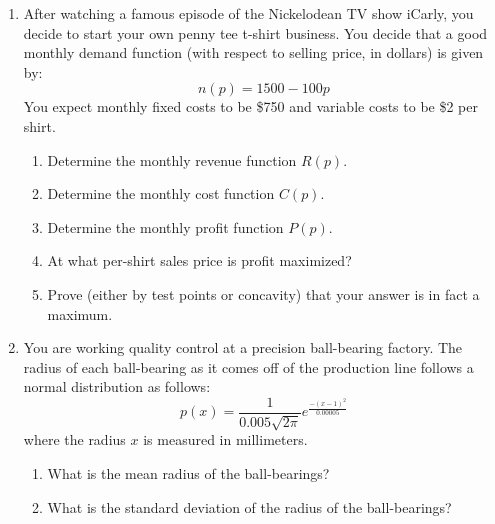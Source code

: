 \documentclass[letterpaper,12pt,fleqn]{article}
\begin{document}
\begin{enumerate}[left=0pt]
  \newpage

\item After watching a famous episode of the Nickelodean TV show iCarly, you decide to start your own penny tee
  t-shirt business.  You decide that a good monthly demand function (with respect to selling price, in dollars) is
  given by:
  \[n(p)=1500-100p\]
  You expect monthly fixed costs to be \$750 and variable costs to be \$2 per shirt.
  \begin{enumerate}
  \item Determine the monthly revenue function \(R(p)\).

    \vspace{1in}

  \item Determine the monthly cost function \(C(p)\).

    \vspace{1in}

  \item Determine the monthly profit function \(P(p)\).

    \vspace{1in}

  \item At what per-shirt sales price is profit maximized?

    \vspace{1.5in}

  \item Prove (either by test points or concavity) that your answer is in fact a maximum.
  \end{enumerate}

  \newpage

\item You are working quality control at a precision ball-bearing factory.  The radius of each ball-bearing as it
  comes off of the production line follows a normal distribution as follows:
  \[p(x)=\frac{1}{0.005\sqrt{2\pi}}e^{\frac{-(x-1)^2}{0.00005}}\]
  where the radius \(x\) is measured in millimeters.
  \begin{enumerate}
  \item What is the mean radius of the ball-bearings?

    \vspace{1in}

  \item What is the standard deviation of the radius of the ball-bearings?

    \vspace{1in}


\end{enumerate}
\end{enumerate}
\end{document}
